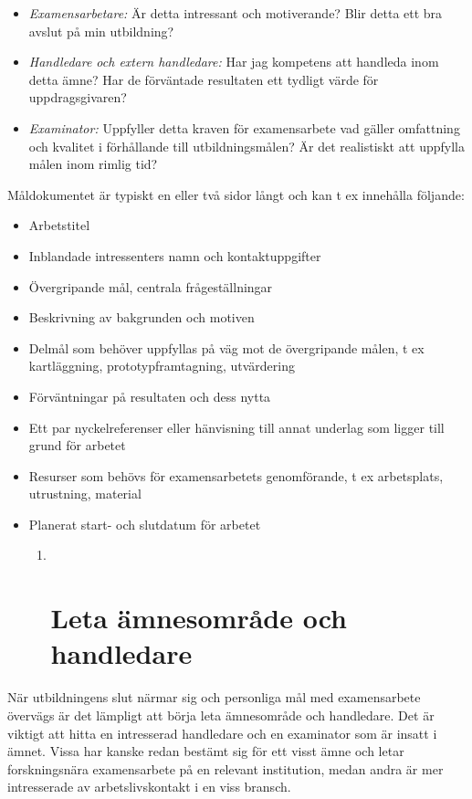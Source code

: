 \begin{itemize}
\item
  \emph{Examensarbetare:} Är detta intressant och motiverande? Blir
  detta ett bra avslut på min utbildning?
\item
  \emph{Handledare och extern handledare:} Har jag kompetens att
  handleda inom detta ämne? Har de förväntade resultaten ett tydligt
  värde för uppdragsgivaren?
\item
  \emph{Examinator:} Uppfyller detta kraven för examensarbete vad gäller
  omfattning och kvalitet i förhållande till utbildningsmålen? Är det
  realistiskt att uppfylla målen inom rimlig tid?
\end{itemize}

Måldokumentet är typiskt en eller två sidor långt och kan t ex innehålla
följande:

\begin{itemize}
\item
  Arbetstitel
\item
  Inblandade intressenters namn och kontaktuppgifter
\item
  Övergripande mål, centrala frågeställningar
\item
  Beskrivning av bakgrunden och motiven
\item
  Delmål som behöver uppfyllas på väg mot de övergripande målen, t ex
  kartläggning, prototypframtagning, utvärdering
\item
  Förväntningar på resultaten och dess nytta
\item
  Ett par nyckelreferenser eller hänvisning till annat underlag som
  ligger till grund för arbetet
\item
  Resurser som behövs för examensarbetets genomförande, t ex
  arbetsplats, utrustning, material
\item
  Planerat start- och slutdatum för arbetet

  \begin{enumerate}
  \def\labelenumi{\arabic{enumi}.}
  \item ~
    \section{Leta ämnesområde och
    handledare}\label{leta-uxe4mnesomruxe5de-och-handledare}
  \end{enumerate}
\end{itemize}

När utbildningens slut närmar sig och personliga mål med examensarbete
övervägs är det lämpligt att börja leta ämnesområde och handledare. Det
är viktigt att hitta en intresserad handledare och en examinator som är
insatt i ämnet. Vissa har kanske redan bestämt sig för ett visst ämne
och letar forskningsnära examensarbete på en relevant institution, medan
andra är mer intresserade av arbetslivskontakt i en viss bransch.

